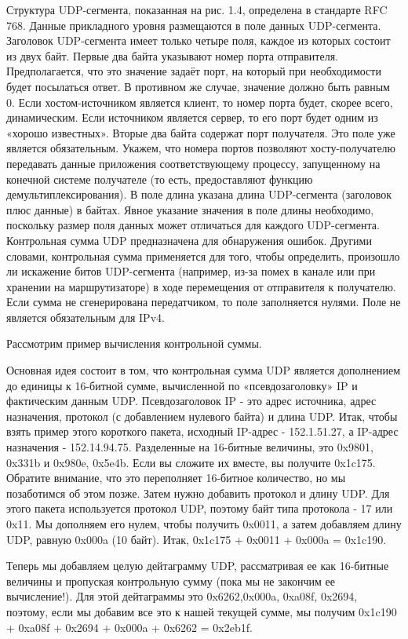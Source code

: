 Структура UDP-сегмента, показанная на рис. 1.4, определена в стандарте RFC 768. Данные прикладного уровня размещаются в поле данных UDP-сегмента. Заголовок UDP-сегмента имеет только четыре поля, каждое из которых состоит из двух байт. Первые два байта указывают номер порта отправителя. Предполагается, что это значение задаёт порт, на который при необходимости будет посылаться ответ. В противном же случае, значение должно быть равным 0. Если хостом-источником является клиент, то номер порта будет, скорее всего, динамическим. Если источником является сервер, то его порт будет одним из «хорошо известных». Вторые два байта содержат порт получателя. Это поле уже является обязательным. Укажем, что номера портов позволяют хосту-получателю передавать данные приложения соответствующему процессу, запущенному на конечной системе получателе (то есть, предоставляют функцию демультиплексирования). 
В поле длина указана длина UDP-сегмента (заголовок плюс данные) в байтах. Явное указание значения в поле длины необходимо, поскольку размер поля данных может отличаться для каждого UDP-сегмента. Контрольная сумма UDP предназначена для обнаружения ошибок. Другими словами, контрольная сумма применяется для того, чтобы определить, произошло ли искажение битов UDP-сегмента (например, из-за помех в канале или при хранении на маршрутизаторе) в ходе перемещения от отправителя к получателю. Если сумма не сгенерирована передатчиком, то поле заполняется нулями. Поле не является обязательным для IPv4.

Рассмотрим пример вычисления контрольной суммы.

Основная идея состоит в том, что контрольная сумма UDP является дополнением до единицы к 16-битной сумме, вычисленной по «псевдозаголовку» IP и фактическим данным UDP. Псевдозаголовок IP - это адрес источника, адрес назначения, протокол (с добавлением нулевого байта) и длина UDP. Итак, чтобы взять пример этого короткого пакета, исходный IP-адрес - 152.1.51.27, а IP-адрес назначения - 152.14.94.75. Разделенные на 16-битные величины, это 0x9801, 0x331b и 0x980e, 0x5e4b. Если вы сложите их вместе, вы получите 0x1c175. Обратите внимание, что это переполняет 16-битное количество, но мы позаботимся об этом позже. Затем нужно добавить протокол и длину UDP. Для этого пакета используется протокол UDP, поэтому байт типа протокола - 17 или 0x11. Мы дополняем его нулем, чтобы получить 0x0011, а затем добавляем длину UDP, равную 0x000a (10 байт). Итак, 0x1c175 + 0x0011 + 0x000a = 0x1c190.

Теперь мы добавляем целую дейтаграмму UDP, рассматривая ее как 16-битные величины и пропуская контрольную сумму (пока мы не закончим ее вычисление!). Для этой дейтаграммы это 0x6262,0x000a, 0xa08f, 0x2694, поэтому, если мы добавим все это к нашей текущей сумме, мы получим 0x1c190 + 0xa08f + 0x2694 + 0x000a + 0x6262 = 0x2eb1f.


